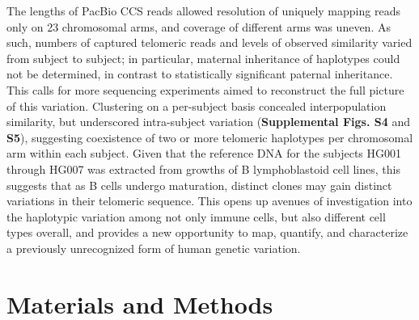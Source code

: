 \documentclass{article}
\begin{document}
    The lengths of PacBio CCS reads allowed resolution of uniquely mapping reads only on 23 chromosomal arms,
        and coverage of different arms was uneven.
        As such, numbers of captured telomeric reads and levels of observed similarity varied from subject to subject;
        in particular, maternal inheritance of haplotypes could not be determined, in contrast to statistically significant paternal inheritance.
        This calls for more sequencing experiments aimed to reconstruct the full picture of this variation.
    Clustering on a per-subject basis concealed interpopulation similarity,
        but underscored intra-subject variation (\textbf{Supplemental Figs. S4} and \textbf{S5}),
            suggesting coexistence of two or more telomeric haplotypes per chromosomal arm within each subject.
        Given that the reference DNA for the subjects HG001 through HG007
            was extracted from growths of B lymphoblastoid cell lines,
            this suggests that as B cells undergo maturation,
                distinct clones may gain distinct variations in their telomeric sequence.
        This opens up avenues of investigation into the haplotypic variation among not only immune cells,
            but also different cell types overall,
            and provides a new opportunity to map, quantify, and characterize a previously unrecognized form of human genetic variation.

\section*{Materials and Methods}  \label{sec:methods}
\end{document}
